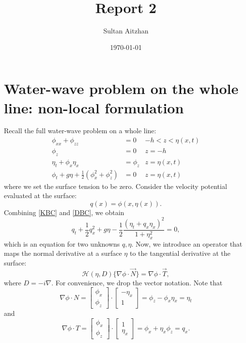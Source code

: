 \documentclass[10pt,reqno,oneside,a4paper]{article}
\author{Sultan Aitzhan}
\title{Report 2}
\date{\today}
\begin{document}
\maketitle
\thispagestyle{fancy}
\tableofcontents


\section{Water-wave problem on the whole line: non-local formulation}

Recall the full water-wave problem on a whole line:
\begin{subequations} \label{DimWholeLineProblem}
\begin{align}
\phi_{xx} + \phi_{zz} &= 0 &-h < z < \eta(x,t) \label{PDE}\\
\phi_{z} &= 0 &z = -h \label{BBC}\\
\eta_t + \phi_{x}\eta_{x} &= \phi_{z} & z = \eta(x,t) \label{KBC}\\
\phi_t + g\eta + \frac{1}{2}(\phi_{x}^2 + \phi_{z}^2) &= 0 &z = \eta(x,t) \label{DBC}
\end{align}
\end{subequations}
where we set the surface tension to be zero. Consider the velocity potential evaluated at the surface:
\[ 
q(x) = \phi (x, \eta(x)).
\]
Combining \eqref{KBC} and \eqref{DBC}, we obtain 
\begin{equation}\label{qEq1}
q_t + \frac{1}{2}q_x^2 + g \eta - \frac{1}{2} \frac{(\eta_t + q_x \eta_x)^2}{1 + \eta_x^2} = 0,
\end{equation}
which is an equation for two unknowns $q ,\eta.$ Now, we introduce an operator that maps the normal derivative at a surface $\eta$ to the tangential derivative at the surface:
\begin{equation}\label{defH1}
\mathcal{H}(\eta, D) \{ \nabla \phi \cdot \vec{N} \} = \nabla \phi \cdot \vec{T},
\end{equation}
where $D = - i \nabla.$ For convenience, we drop the vector notation. Note that
\[ 
\nabla \phi \cdot N = \begin{bmatrix} \phi_x \\ \phi_z \end{bmatrix} \cdot \begin{bmatrix} -\eta_x \\ 1 \end{bmatrix} = \phi_z - \phi_x \eta_x = \eta_t
\] 
and 
\[ 
\nabla \phi \cdot T = \begin{bmatrix} \phi_x \\ \phi_z \end{bmatrix} \cdot \begin{bmatrix} 1 \\ \eta_x \end{bmatrix} = \phi_x + \eta_x \phi_z = q_x.
\]
\end{document}
